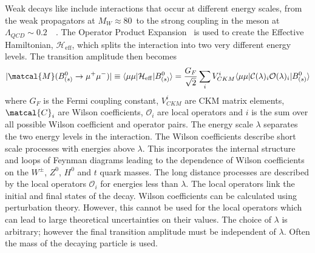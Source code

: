 {{Weak decays like \bmumu include interactions that occur at different energy scales, from the weak propagators at $M_W \approx 80$~\gevcc to the strong coupling in the \bsd meson at $\Lambda_{QCD} \sim 0.2$~\gev~\cite{Olive:2016xmw}. %
The Operator Product Expansion~\cite{PhysRev.179.1499,Wilson1972} is used to create the Effective Hamiltonian, $\mathcal{H}_{\mathrm{eff}}$, which splits the interaction into two very different energy levels. The transition amplitude then becomes 
\begin{equation}
|\matcal{M}(B^0_{(s)} \to \mu^+ \mu^-)| \equiv \langle \mu \mu | \mathcal{H}_{\mathrm{eff}} | B^0_{(s)} \rangle  = \frac{G_F}{\sqrt{2}} \displaystyle\sum_{i} V^i_{CKM} \langle \mu \mu | \mathcal{C}(\lambda)_i \mathcal{O}(\lambda)_i | B^0_{(s)} \rangle
\label{sec:eff_hamil_def}
\end{equation}
where $G_F$ is the Fermi coupling constant, $V_{CKM}^i$ are CKM matrix elements, $\matcal{C}_i$ are Wilson coefficients, $\mathcal{O}_i$ are local operators and $i$ is the sum over all possible Wilson coefficient and operator pairs. The energy scale $\lambda$ separates the two energy levels in the interaction. The Wilson coefficients describe short scale processes with energies above $\lambda$. This incorporates the internal structure and loops of Feynman diagrams leading to the dependence of Wilson coefficients on the $W^{\pm}$, $Z^0$, $H^0$ and $t$ quark masses. The long distance processes are described by the local operators $\mathcal{O}_i$ for energies less than $\lambda$. The local operators link the initial and final states of the decay. %
Wilson coefficients can be calculated using perturbation theory. However, this cannot be used for the local operators which can lead to large theoretical uncertainties on their values. The choice of $\lambda$ is arbitrary; however the final transition amplitude must be independent of $\lambda$. Often the mass of the decaying particle is used. 

}}
